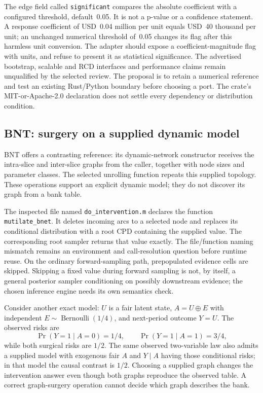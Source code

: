 The edge field called \texttt{significant} compares the absolute coefficient
with a configured threshold, default~0.05. It is not a p-value or a
confidence statement. A response coefficient of USD~0.04 million per unit
equals USD~40 thousand per unit; an unchanged numerical threshold of~0.05
changes its flag after this harmless unit conversion. The adapter should
expose a coefficient-magnitude flag with units, and refuse to present it as
statistical significance. The advertised bootstrap, scalable and RCD
interfaces and performance claims remain unqualified by the selected review.
The proposal is to retain a numerical reference and test an existing
Rust/Python boundary before choosing a port. The crate's MIT-or-Apache-2.0
declaration does not settle every dependency or distribution condition.
\citep{exec17_temporal_varlingam,exec17_temporal_oracle}

\subsection{BNT: surgery on a supplied dynamic model}

BNT offers a contrasting reference: its dynamic-network constructor receives
the intra-slice and inter-slice graphs from the caller, together with node
sizes and parameter classes. The selected unrolling function repeats this
supplied topology. These operations support an explicit dynamic model; they
do not discover its graph from a bank table.
\citep{exec17_temporal_bnt}

The inspected file named \texttt{do\_intervention.m} declares the function
\texttt{mutilate\_bnet}. It deletes incoming arcs to a selected node and
replaces its conditional distribution with a root CPD containing the supplied
value. The corresponding root sampler returns that value exactly.
The file/function naming mismatch remains an environment and call-resolution
question before runtime reuse. On the ordinary forward-sampling path,
prepopulated evidence cells are skipped. Skipping a fixed value during forward
sampling is not, by itself, a general posterior sampler conditioning on
possibly downstream evidence; the chosen inference engine needs its own
semantics check.
\citep{exec17_temporal_bnt}

Consider another exact model: $U$ is a fair latent state,
$A=U\oplus E$ with independent $E\sim\operatorname{Bernoulli}(1/4)$, and
next-period outcome $Y=U$. The observed risks are
\[
 \Pr(Y=1\mid A=0)=1/4,\qquad
 \Pr(Y=1\mid A=1)=3/4,
\]
while both surgical risks are $1/2$. The same observed two-variable law
also admits a supplied model with exogenous fair $A$ and
$Y\mid A$ having those conditional risks; in that model the causal contrast
is $1/2$. Choosing a supplied graph changes the intervention answer even
though both graphs reproduce the observed table. A correct graph-surgery
operation cannot decide which graph describes the bank.
\citep{exec17_temporal_oracle}

